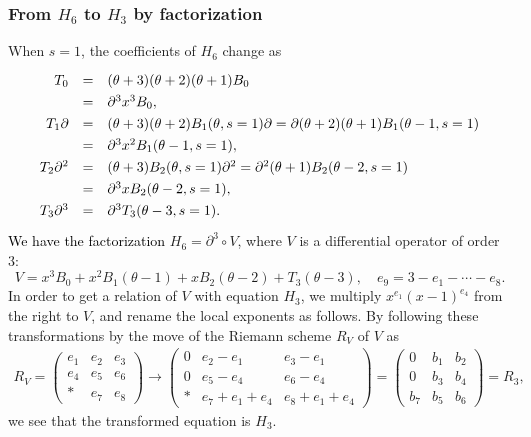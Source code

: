 \documentclass[a4paper,12pt]{article}
\theoremstyle{definition}
\theoremstyle{remark}
\numberwithin{equation}{section} %
\newcommand{\blue}[1]{\textcolor{black}{#1}}
\begin{document}
\subsubsection{From $H_6$ to $H_3$ by factorization}\label{fromG6toG3byFactor}\label{fromG6toG3}%
When $s=1$,  the coefficients of $H_6$ change as
\[ \def\arraystretch{1.3} \begin{array}{rcl}       %
  T_0 &=&(\theta+3)(\theta+2)(\theta+1)B_0\\%
  &=& \partial^3 x^3B_0,\\%
  T_1 \partial &=& (\theta+3)(\theta+2) B_1(\theta,s=1) \partial
  = \partial (\theta+2)(\theta+1) B_1(\theta-1, s=1)\\
  &=& \partial^3 x^2 B_1(\theta-1,s=1),\\
  T_2 \partial^2 &=& (\theta+3) B_2(\theta,s=1) \partial^2
  = \partial^2 (\theta+1) B_2(\theta-2,s=1) \\
&=& \partial^3 x B_2(\theta-2,s=1),\\
  T_3 \partial^3 &=& \partial^3 T_3(\theta-3, s=1).
\end{array}\]
\blue{We have the factorization} $H_6=\partial^3\circ V$, where $V$ is a differential operator of order 3:
$$ V=x^3B_0+x^2B_1(\theta-1)+xB_2(\theta-2)+T_3(\theta-3),\quad e_9=3-e_1-\cdots-e_8.$$
In order to get a relation of $V$ with equation $H_3$, 
we multiply $x^{e_1}(x-1)^{e_4}$ from the right to $V$,
and rename the local exponents as follows. By following  these transformations
by the move of the Riemann scheme $R_V$ of $V$ as
$$\begin{array}{l}R_V=\left(\begin{array}{lll}
  e_1&e_2&e_3\\
  e_4&e_5&e_6\\
  *&e_7&e_8\end{array}\right)
  \to
  \left(\begin{array}{lll}
  0&e_2-e_1&e_3-e_1\\
  0&e_5-e_4&e_6-e_4\\
  *&e_7+e_1+e_4&e_8+e_1+e_4\end{array}\right)
=\left(\begin{array}{lll}
  0&b_1&b_2\\
  0&b_3&b_4\\
  b_7&b_5&b_6\end{array}\right)=R_3,\end{array}
  $$
we see that the transformed equation is $H_3$.
\end{document}

